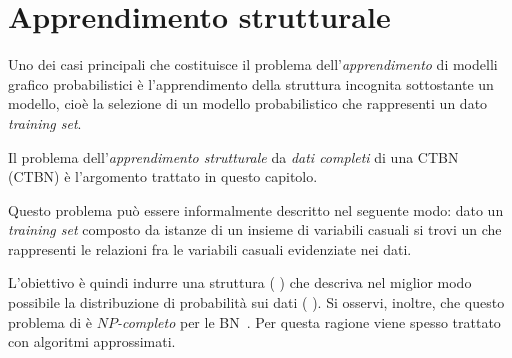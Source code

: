 
\chapter{Apprendimento strutturale}
\label{cap:structurallearning}
Uno dei casi principali che costituisce il problema dell'\emph{apprendimento} di modelli grafico probabilistici è l'apprendimento della struttura incognita sottostante un modello, cioè la selezione di un modello probabilistico che rappresenti un dato \emph{training set}. %

Il problema dell'\emph{apprendimento strutturale} da \emph{dati completi} di una \acl{CTBN} (\acs{CTBN}) è l'argomento trattato in questo capitolo.

Questo problema può essere informalmente descritto nel seguente modo: dato un \emph{training set} composto da istanze di un insieme di variabili casuali si trovi un  che rappresenti le relazioni fra le variabili casuali evidenziate nei dati. %

L'obiettivo è quindi indurre una struttura (\ie{} ) che descriva nel miglior modo possibile la distribuzione di probabilità sui dati (\ie{} \emph{}). Si osservi, inoltre, che questo problema di  è \emph{$NP$-completo} per le \acl{BN}~\citep{Chickering1994,Chickering2004}. Per questa ragione viene spesso trattato con algoritmi approssimati. %

